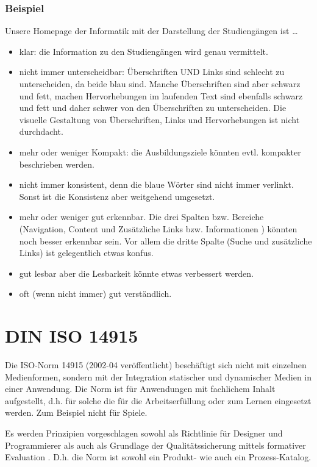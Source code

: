 \subsubsection*{Beispiel}
Unsere Homepage der Informatik mit der Darstellung der Studiengängen ist …
\begin{itemize}
\item klar: die Information zu den Studiengängen wird genau vermittelt.
\item  nicht immer unterscheidbar: Überschriften UND Links sind schlecht zu unterscheiden, da beide blau sind. Manche Überschriften sind aber schwarz und fett, machen Hervorhebungen im laufenden Text sind ebenfalls schwarz und fett und daher schwer von den Überschriften zu unterscheiden. Die visuelle Gestaltung von Überschriften, Links und Hervorhebungen ist nicht durchdacht. 
\item  mehr oder weniger Kompakt: die Ausbildungsziele könnten evtl. kompakter beschrieben werden.
\item  nicht immer konsistent, denn die blaue Wörter sind nicht immer verlinkt. Sonst ist die Konsistenz aber weitgehend umgesetzt.
\item  mehr oder weniger gut erkennbar. Die drei Spalten bzw. Bereiche (Navigation, Content und Zusätzliche Links bzw. Informationen ) könnten noch besser erkennbar sein. Vor allem die dritte Spalte (Suche und zusätzliche Links) ist gelegentlich etwas konfus.
\item  gut lesbar aber die Lesbarkeit könnte etwas verbessert werden.
\item  oft (wenn nicht immer) gut verständlich.
\end{itemize}

\section{DIN ISO 14915}
Die ISO-Norm 14915 (2002-04 veröffentlicht) beschäftigt sich nicht mit einzelnen Medienformen, sondern mit der Integration statischer und dynamischer Medien in einer Anwendung. Die Norm ist für Anwendungen mit fachlichem Inhalt aufgestellt, d.h. für solche die für die Arbeitserfüllung oder zum Lernen eingesetzt werden. Zum Beispiel nicht für Spiele. 
 
Es werden Prinzipien vorgeschlagen sowohl als Richtlinie für Designer und Programmierer als auch als Grundlage der Qualitätssicherung mittels formativer Evaluation . D.h. die Norm ist sowohl ein Produkt- wie auch ein Prozess-Katalog. 

